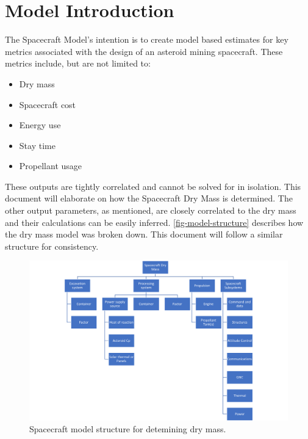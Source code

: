 \section{Model Introduction}
The Spacecraft Model's intention is to create model based estimates for key metrics associated with the design of an asteroid mining spacecraft. 
These metrics include, but are not limited to:
\begin{itemize}
    \item Dry mass
    \item Spacecraft cost
    \item Energy use
    \item Stay time
    \item Propellant usage
\end{itemize} 
These outputs are tightly correlated and cannot be solved for in isolation. This document will elaborate on how the Spacecraft Dry Mass is determined. 
The other output parameters, as mentioned, are closely correlated to the dry mass and their calculations can be easily inferred.
\newline
\autoref{fig-model-structure} describes how the dry mass model was broken down. This document will follow a similar structure for consistency. 

\begin{figure}[htb]
    \centering
    \includegraphics[width=0.9\linewidth]{mass structure.png}
    \caption{Spacecraft model structure for detemining dry mass.}
    \label{fig-model-structure}
\end{figure}


